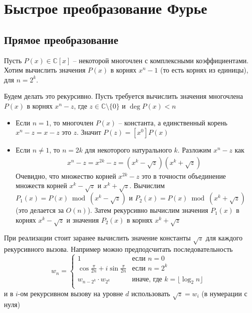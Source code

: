 \section{Быстрое преобразование Фурье}


\subsection{Прямое преобразование}
\label{forward_fft}

Пусть $P(x) \in \mathbb{C}[x]$ -- некоторой многочлен с комплексными коэффициентами.
Хотим вычислить значения $P(x)$ в корнях $x^n - 1$ (то есть корнях из единицы), для $n = 2^k$.

Будем делать это рекурсивно. Пусть требуется вычислить значения многочлена $P(x)$ в корнях $x^{n} - z$, где $z \in \mathbb{C} \setminus \{0\}$ и $\deg P(x) < n$
\begin{itemize}
    \item Если $n = 1$, то многочлен $P(x)$ -- константа, а единственный корень $x^n - z = x - z$ это $z$. Значит $P(z) = [x^0]P(x)$

    \item          Если $n \neq 1$, то $n = 2k$ для некоторого натурального $k$. Разложим $x^n - z$ как
          \begin{gather}
              x^n - z = x^{2k} - z = (x^k - \sqrt{z})(x^k + \sqrt{z})
          \end{gather}
          Очевидно, что множество корней $x^{2k} - z$ это в точности объединение множеств корней $x^k - \sqrt{z}$ и $x^k + \sqrt{z}$.
          Вычислим $P_1(x) = P(x) \bmod (x^k - \sqrt{z})$ и $P_2(x) = P(x) \bmod (x^k + \sqrt{z})$ (это делается за $O(n)$).
          Затем рекурсивно вычислим значения $P_1(x)$ в корнях $x^k - \sqrt{z}$ и значения $P_2(x)$ в корнях $x^k + \sqrt{z}$
\end{itemize}

При реализации стоит заранее вычислить значение константы $\sqrt{z}$ для каждого рекурсивного вызова.
Например можно предподсчитать последовательность
$$
    w_n = \begin{cases}
        1                                           & \text{если $n = 0$}                              \\
        \cos \frac{\pi}{2n} + i \sin \frac{\pi}{2n} & \text{если $n = 2^k$}                            \\
        w_{n - 2^k} \cdot w_{2^k}                   & \text{иначе, где $k = \lfloor \log_2 n \rfloor$} \\
    \end{cases}
$$
и в $i$-ом рекурсивном вызову на уровне $d$ использовать $\sqrt{z} = w_i$ (в нумерации с нуля)


